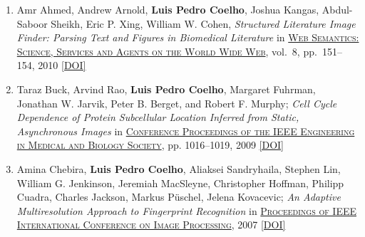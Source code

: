 \documentclass{article}
\newcommand\showdoi[1]{%
    \href{https://doi.org/#1}{[DOI]}%
}
\newcommand\pubname[1]{\textsc{\uline{#1}}}
\newcommand\contribution[1]{\relax}
\begin{document}
\begin{enumerate}[resume]
\item Amr Ahmed, Andrew Arnold, \textbf{Luis Pedro Coelho}, Joshua Kangas,
Abdul-Saboor Sheikh, Eric P. Xing, William W. Cohen, \emph{Structured
Literature Image Finder: Parsing Text and Figures in Biomedical Literature} in
\pubname{Web Semantics: Science, Services and Agents on the World Wide Web},
vol.\ 8, pp.\ 151--154, 2010 \showdoi{10.1016/j.websem.2010.04.002}

\item Taraz Buck, Arvind Rao, \textbf{Luis Pedro Coelho}, Margaret Fuhrman,
Jonathan W. Jarvik, Peter B. Berget, and Robert F. Murphy; \emph{Cell Cycle
Dependence of Protein Subcellular Location Inferred from Static, Asynchronous
Images} in \pubname{Conference Proceedings of the IEEE Engineering in Medical
and Biology Society}, pp. 1016--1019, 2009 \showdoi{10.1109/IEMBS.2009.5332888}
\contribution{I helped the first author acquire relevant microscopy data.}

\item Amina Chebira, \textbf{Luis Pedro Coelho}, Aliaksei Sandryhaila, Stephen
Lin, William G. Jenkinson, Jeremiah MacSleyne, Christopher Hoffman, Philipp
Cuadra, Charles Jackson, Markus Püschel, Jelena Kovacevic; \emph{An Adaptive
Multiresolution Approach to Fingerprint Recognition} in \pubname{Proceedings of
IEEE International Conference on Image Processing}, 2007
\showdoi{10.1109/ICIP.2007.4378990}
\contribution{I developed and implemented one of the methods presented in the
paper.}

\end{enumerate}
\end{document}
